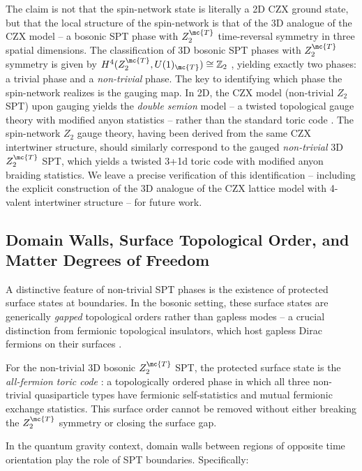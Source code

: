 The claim is not that the spin-network state is literally a 2D CZX ground state, but that the local structure of the spin-network is that of the 3D analogue of the CZX model -- a bosonic SPT phase with $ Z_2^{\mc{T}} $ time-reversal symmetry in three spatial dimensions. The classification of 3D bosonic SPT phases with $ Z_2^{\mc{T}} $ symmetry is given by $ H^4(Z_2^{\mc{T}}, U(1)_{\mc{T}}) \cong \mathbb{Z}_2 $ \cite{Vishwanath2013Physics,Kapustin2014Symmetry}, yielding exactly two phases: a trivial phase and a \emph{non-trivial} phase. The key to identifying which phase the spin-network realizes is the gauging map. In 2D, the CZX model (non-trivial $ Z_2 $ SPT) upon gauging yields the \emph{double semion} model -- a twisted topological gauge theory with modified anyon statistics -- rather than the standard toric code \cite{Levin2012Braiding,Haegeman2015Gauging}. The spin-network $ Z_2 $ gauge theory, having been derived from the same CZX intertwiner structure, should similarly correspond to the gauged \emph{non-trivial} 3D $ Z_2^{\mc{T}} $ SPT, which yields a twisted 3+1d toric code with modified anyon braiding statistics. We leave a precise verification of this identification -- including the explicit construction of the 3D analogue of the CZX lattice model with 4-valent intertwiner structure -- for future work.

\subsection{Domain Walls, Surface Topological Order, and Matter Degrees of Freedom}\label{subsec:edge-modes}

A distinctive feature of non-trivial SPT phases is the existence of protected surface states at boundaries. In the bosonic setting, these surface states are generically \emph{gapped} topological orders rather than gapless modes -- a crucial distinction from fermionic topological insulators, which host gapless Dirac fermions on their surfaces \cite{Vishwanath2013Physics}.

For the non-trivial 3D bosonic $ Z_2^{\mc{T}} $ SPT, the protected surface state is the \emph{all-fermion toric code} \cite{Vishwanath2013Physics}: a topologically ordered phase in which all three non-trivial quasiparticle types have fermionic self-statistics and mutual fermionic exchange statistics. This surface order cannot be removed without either breaking the $ Z_2^{\mc{T}} $ symmetry or closing the surface gap.

In the quantum gravity context, domain walls between regions of opposite time orientation play the role of SPT boundaries. Specifically:

